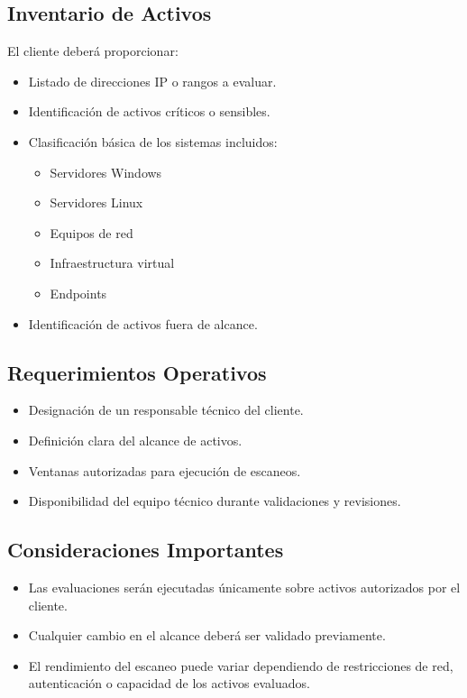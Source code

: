 \documentclass[a4paper]{article}
\begin{document}
    \subsection{Inventario de Activos}
    El cliente deberá proporcionar:
    \begin{itemize}
        \item Listado de direcciones IP o rangos a evaluar.
        \item Identificación de activos críticos o sensibles.
        \item Clasificación básica de los sistemas incluidos:
            \begin{itemize}
                \item Servidores Windows
                \item Servidores Linux
                \item Equipos de red
                \item Infraestructura virtual
                \item Endpoints
            \end{itemize}
        \item Identificación de activos fuera de alcance.
    \end{itemize}

    \subsection{Requerimientos Operativos}
    \begin{itemize}
        \item Designación de un responsable técnico del cliente.
        \item Definición clara del alcance de activos.
        \item Ventanas autorizadas para ejecución de escaneos.
        \item Disponibilidad del equipo técnico durante validaciones y revisiones.
    \end{itemize}

    \subsection{Consideraciones Importantes}
    \begin{itemize}
        \item Las evaluaciones serán ejecutadas únicamente sobre activos autorizados por el cliente.
        \item Cualquier cambio en el alcance deberá ser validado previamente.
        \item El rendimiento del escaneo puede variar dependiendo de restricciones de red, autenticación o capacidad de los activos evaluados.
    \end{itemize}
\end{document}
